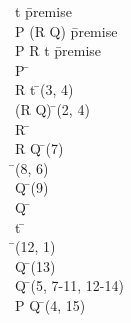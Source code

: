 \documentclass{article}
\begin{document}
\begin{proofbox}
\: \lnot t \= \hbox{premise} \\
\: P \rightarrow \lnot (R \lor Q) \= \hbox{premise} \\
\: P \rightarrow R \lor t \= \hbox{premise} \\
\open
\: P \= \asm \\
\: R \lor t \= \implieselim(3, 4) \\
\: \lnot (R \lor Q) \= \implieselim(2, 4) \\
\openAlt
\: R \= \asm \\
\: R \lor Q \= \orintro(7) \\
\: \bot \= \bottomintro(8, 6) \\
\: \lnot Q \= \bottomelim(9) \\
\: \lnot Q \=  \\
\splitAlt
\: t \= \asm \\
\: \bot \= \bottomintro(12, 1) \\
\: \lnot Q \= \bottomelim(13) \\
\closeAlt
\: \lnot Q \= \orelim(5, 7-11, 12-14) \\
\close
\: P \rightarrow \lnot Q \= \impliesintro(4, 15) \\
\end{proofbox}
\end{document}

